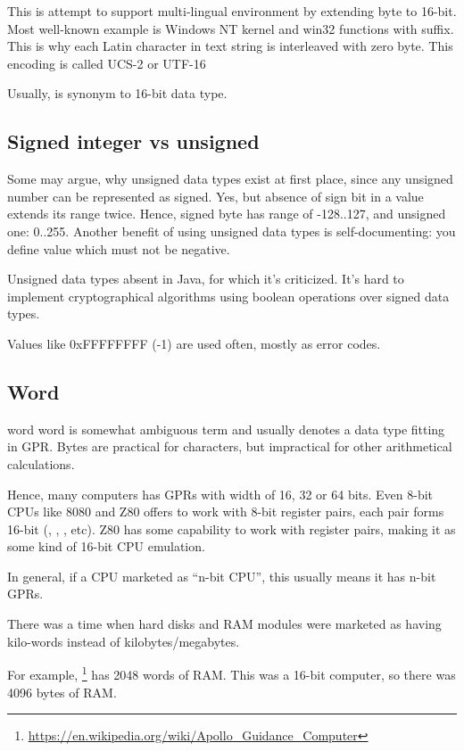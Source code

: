 This is attempt to support multi-lingual environment by extending byte to 16-bit.
Most well-known example is Windows NT kernel and win32 functions with  suffix.
This is why each Latin character in text string is interleaved with zero byte.
This encoding is called UCS-2 or UTF-16

Usually,  is synonym to 16-bit  data type.

\subsection{Signed integer vs unsigned}

Some may argue, why unsigned data types exist at first place, since any unsigned number can be represented as signed.
Yes, but absence of sign bit in a value extends its range twice.
Hence, signed byte has range of -128..127, and unsigned one: 0..255.
Another benefit of using unsigned data types is self-documenting: you define value which must not be negative.

Unsigned data types absent in Java, for which it's criticized.
It's hard to implement cryptographical algorithms using boolean operations over signed data types.

Values like 0xFFFFFFFF (-1) are used often, mostly as error codes.

\subsection{Word}

\Gls{word} word is somewhat ambiguous term and usually denotes a data type fitting in \ac{GPR}.
Bytes are practical for characters, but impractical for other arithmetical calculations.

Hence, many computers has GPRs with width of 16, 32 or 64 bits.
Even 8-bit CPUs like 8080 and Z80 offers to work with 8-bit register pairs, each pair forms 16-bit 
(, , , etc).
Z80 has some capability to work with register pairs, making it as some kind of 16-bit CPU emulation.

In general, if a CPU marketed as ``n-bit CPU'', this usually means it has n-bit \ac{GPR}s.

There was a time when hard disks and \ac{RAM} modules were marketed as having  kilo-words instead of
 kilobytes/megabytes.

For example, \footnote{\url{https://en.wikipedia.org/wiki/Apollo_Guidance_Computer}}
has 2048 words of \ac{RAM}.
This was a 16-bit computer, so there was 4096 bytes of \ac{RAM}.

